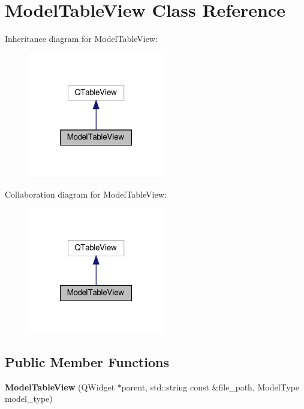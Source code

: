 \hypertarget{classModelTableView}{}\section{Model\+Table\+View Class Reference}
\label{classModelTableView}


Inheritance diagram for Model\+Table\+View\+:\nopagebreak
\begin{figure}[H]
\begin{center}
\leavevmode
\includegraphics[width=169pt]{classModelTableView__inherit__graph}
\end{center}
\end{figure}


Collaboration diagram for Model\+Table\+View\+:\nopagebreak
\begin{figure}[H]
\begin{center}
\leavevmode
\includegraphics[width=169pt]{classModelTableView__coll__graph}
\end{center}
\end{figure}
\subsection*{Public Member Functions}
\begin{DoxyCompactItemize}
\item 
\mbox{\label{classModelTableView_a064d6950aeb8a512fbd0557e3926ecf3}} 
{\bfseries Model\+Table\+View} (Q\+Widget $\ast$parent, std\+::string const \&file\+\_\+path, Model\+Type model\+\_\+type)
\end{DoxyCompactItemize}
